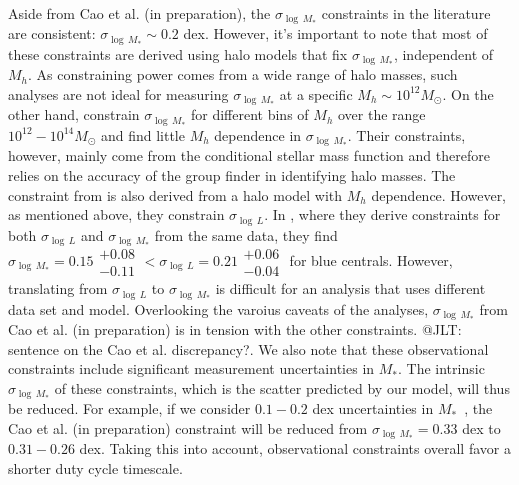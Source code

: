 \documentclass[12pt, letterpaper, preprint, tighten]{aastex62}
\newcommand{\ch}[1]{\color{orange}{\bf CH:} #1}
\begin{document}
Aside from Cao et al. (in preparation), the $\sigma_{\log\,M_*}$ constraints 
in the literature are consistent: $\sigma_{\log\,M_*} \sim 0.2$ dex. However, 
it's important to note that most of these constraints are derived using halo
models that fix $\sigma_{\log\,M_*}$, independent of $M_h$. As constraining 
power comes from a wide range of halo masses, such analyses are not ideal 
for measuring $\sigma_{\log\,M_*}$ at a specific $M_h\sim 10^{12}M_\odot$. 
On the other hand, \cite{reddick2013} constrain $\sigma_{\log\,M_*}$ for 
different bins of $M_h$ over the range $10^{12} - 10^{14} M_\odot$ and find 
little $M_h$ dependence in $\sigma_{\log\,M_*}$. Their constraints, however,
mainly come from the conditional stellar mass function and therefore relies on 
the accuracy of the \cite{tinker2011} group finder in identifying halo masses. 
The constraint from \cite{lange2018a} is also derived from a halo model 
with $M_h$ dependence. However, as mentioned above, they constrain $\sigma_{\log\,L}$. 
In \cite{more2011}, where they derive constraints for both $\sigma_{\log\,L}$ 
and $\sigma_{\log\,M_*}$ from the same data, they find 
$\sigma_{\log\,M_*} = 0.15\substack{+0.08\\ -0.11} < \sigma_{\log\,L} = 0.21\substack{+0.06\\ -0.04}$
for blue centrals. However, translating from $\sigma_{\log\,L}$ to 
$\sigma_{\log\,M_*}$ is difficult for an analysis that uses different data 
set and model. Overlooking the varoius caveats of the analyses, 
$\sigma_{\log\,M_*}$ from Cao et al. (in preparation) is in tension with 
the other constraints. {\ch @JLT: sentence on the Cao et al. discrepancy?}. 
We also note that these observational constraints include significant measurement 
uncertainties in $M_*$. The intrinsic $\sigma_{\log\,M_*}$ of these constraints, 
which is the scatter predicted by our model, will thus be reduced. For example, 
if we consider $0.1 - 0.2$ dex uncertainties in $M_*$~\citep{roediger2015}, 
the Cao et al. (in preparation) constraint will be reduced from 
$\sigma_{\log\,M_*} = 0.33$ dex to $0.31 - 0.26$ dex. Taking this into account,  
observational constraints overall favor a shorter duty cycle timescale. 
\end{document}
